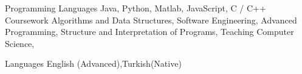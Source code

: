 

\begin{cvskills}

  \cvskill
    {Programming Languages} %
    {Java, Python, Matlab, JavaScript, C / C++ } %
  \cvskill
    {Coursework} %
    {Algorithms and Data Structures, Software Engineering, Advanced Programming, Structure and Interpretation of Programs, Teaching Computer Science,} %



  \cvskill
    {Languages} %
    {English (Advanced),Turkish(Native)} %

\end{cvskills}
